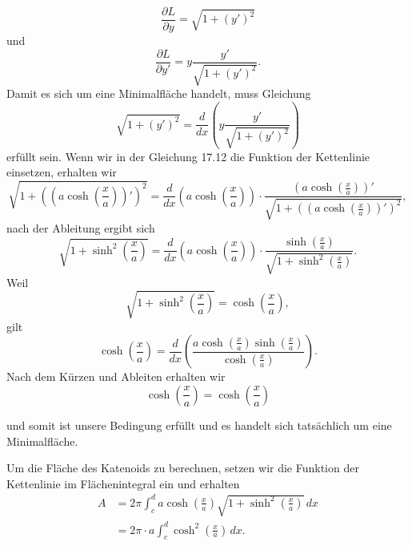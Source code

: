 \begin{equation}
	\frac{\partial L}{\partial y} = \sqrt{1 + (y')^2}
\end{equation}
und 
\begin{equation}
	\frac{\partial L}{\partial y'} = y \frac{y'}{\sqrt{1 + (y')^2}}.
\end{equation}
Damit es sich um eine Minimalfläche handelt, muss Gleichung
\begin{equation}
	\sqrt{1 + (y')^2} = \frac{d}{dx} \left( y \frac{y'}{\sqrt{1 + (y')^2}} \right)
\end{equation}
erfüllt sein.
Wenn wir in der Gleichung 17.12 die Funktion der Kettenlinie einsetzen, erhalten wir 
\begin{equation}
	\sqrt{1 + \left( \left( a \cosh \left( \frac{x}{a} \right) \right)' \right)^2 } = \frac{d}{dx} \left( a \cosh \left( \frac{x}{a} \right) \right) \cdot \frac{\left( a \cosh \left( \frac{x}{a} \right) \right)'}{\sqrt{1 + \left( \left( a \cosh \left( \frac{x}{a} \right) \right)' \right)^2 }},
\end{equation}
nach der Ableitung ergibt sich 
\begin{equation}
	\sqrt{1 + \sinh^2 \left( \frac{x}{a} \right)} = \frac{d}{dx}  \left( a \cosh \left( \frac{x}{a} \right) \right) \cdot \frac{\sinh \left( \frac{x}{a} \right)}{\sqrt{1 + \sinh^2 \left( \frac{x}{a} \right)}}.
\end{equation}
Weil
\begin{equation}
	\sqrt{1 + \sinh^2 \left( \frac{x}{a} \right)} = \cosh \left( \frac{x}{a} \right),
\end{equation}
gilt 
\begin{equation}
	\cosh \left( \frac{x}{a} \right) = \frac{d}{dx} \left( \frac{a \cosh \left( \frac{x}{a} \right) \sinh \left( \frac{x}{a} \right)}{\cosh \left( \frac{x}{a} \right)} \right).
\end{equation}	
Nach dem Kürzen und Ableiten erhalten wir 
\begin{equation}
	\cosh \left( \frac{x}{a} \right) = \cosh \left( \frac{x}{a} \right)
\end{equation}	

und somit ist unsere Bedingung erfüllt und es handelt sich tatsächlich um eine Minimalfläche. 

Um die Fläche des Katenoids zu berechnen, setzen wir die Funktion der Kettenlinie im Flächenintegral ein und erhalten 
\begin{align}
	A &= 2\pi \int_{c}^{d} a \cosh \left( \frac{x}{a} \right) \sqrt{1 + \sinh^2 \left( \frac{x}{a} \right)} \,dx \\
	&= 2\pi \cdot a \int_{c}^{d} \cosh^2 \left( \frac{x}{a} \right) \,dx.
\end{align}
